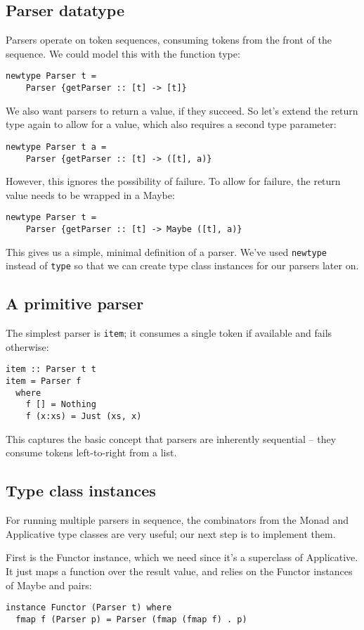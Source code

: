 \documentclass{tmr}
\begin{document}
\subsection{Parser datatype}

Parsers operate on token sequences, consuming tokens from the front of the sequence.
We could model this with the function type:
\begin{verbatim}
newtype Parser t = 
    Parser {getParser :: [t] -> [t]}
\end{verbatim}

We also want parsers to return a value, if they succeed.  So let's extend the return type
again to allow for a value, which also requires a second type parameter:
\begin{verbatim}
newtype Parser t a = 
    Parser {getParser :: [t] -> ([t], a)}
\end{verbatim}

However, this ignores the possibility of failure.  To allow for failure, the return value needs to
be wrapped in a Maybe:
\begin{verbatim}
newtype Parser t = 
    Parser {getParser :: [t] -> Maybe ([t], a)}
\end{verbatim}

This gives us a simple, minimal definition of a parser.  We've used
\verb+newtype+ instead of \verb+type+ so that we can create type class
instances for our parsers later on.


\subsection{A primitive parser}
The simplest parser is \verb+item+; it 
consumes a single token if available and fails otherwise:
\begin{verbatim}
item :: Parser t t
item = Parser f
  where 
    f [] = Nothing
    f (x:xs) = Just (xs, x)
\end{verbatim}

This captures the basic concept that parsers are inherently sequential --
they consume tokens left-to-right from a list.


\subsection{Type class instances}
For running multiple parsers in sequence, the combinators from the Monad and
Applicative type classes are very useful; our next step is to implement them.

First is the Functor instance, which we need since it's a superclass
of Applicative.  It just maps a function over the result value, and
relies on the Functor instances of Maybe and pairs:
\begin{verbatim}
instance Functor (Parser t) where
  fmap f (Parser p) = Parser (fmap (fmap f) . p)
\end{verbatim}
\end{document}

